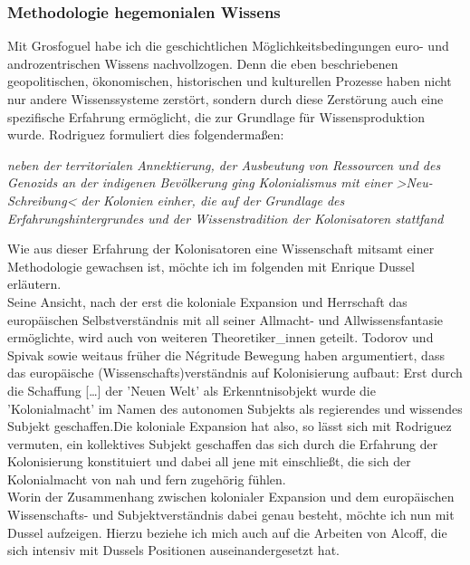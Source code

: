 \subsubsection{Methodologie hegemonialen Wissens}
Mit Grosfoguel habe ich die geschichtlichen Möglichkeitsbedingungen euro- und androzentrischen Wissens nachvollzogen. Denn die eben beschriebenen geopolitischen, ökonomischen, historischen und kulturellen Prozesse haben nicht nur andere Wissenssysteme zerstört, sondern durch diese Zerstörung auch eine spezifische Erfahrung ermöglicht, die zur Grundlage für Wissensproduktion wurde. Rodriguez formuliert dies folgendermaßen:
\begin{myenv}
  \textit{
  \glqq
[....] neben der territorialen Annektierung, der Ausbeutung von Ressourcen und des Genozids an der indigenen Bevölkerung ging Kolonialismus mit einer >Neu-Schreibung< der Kolonien einher, die auf der Grundlage des Erfahrungshintergrundes und der Wissenstradition der Kolonisatoren stattfand\grqq }\footnotemark{}
\end{myenv}
Wie aus dieser Erfahrung der Kolonisatoren eine Wissenschaft mitsamt einer
Methodologie gewachsen ist, möchte ich im folgenden mit Enrique Dussel
erläutern. \\
Seine Ansicht, nach der erst die koloniale Expansion und Herrschaft
das europäischen Selbstverständnis mit all seiner Allmacht- und
Allwissensfantasie ermöglichte, wird auch von weiteren Theoretiker\_innen
geteilt. Todorov und Spivak sowie weitaus früher die Négritude Bewegung haben
argumentiert, dass das europäische (Wissenschafts)verständnis auf Kolonisierung
aufbaut: Erst durch die \glqq Schaffung […] der 'Neuen Welt' als
Erkenntnisobjekt wurde die 'Kolonialmacht' im Namen des autonomen Subjekts als
regierendes und wissendes Subjekt geschaffen.\grqq Die koloniale Expansion
hat also, so lässt sich mit Rodriguez vermuten, ein kollektives Subjekt
geschaffen das sich durch die Erfahrung der Kolonisierung konstituiert und
dabei all jene mit einschließt, die sich der Kolonialmacht von nah und fern
zugehörig fühlen.  \\
Worin der Zusammenhang zwischen kolonialer Expansion und dem
europäischen Wissenschafts- und Subjektverständnis dabei genau besteht, möchte
ich nun mit Dussel aufzeigen. Hierzu beziehe ich mich auch auf die Arbeiten von
Alcoff, die sich intensiv mit Dussels Positionen auseinandergesetzt hat.\\

